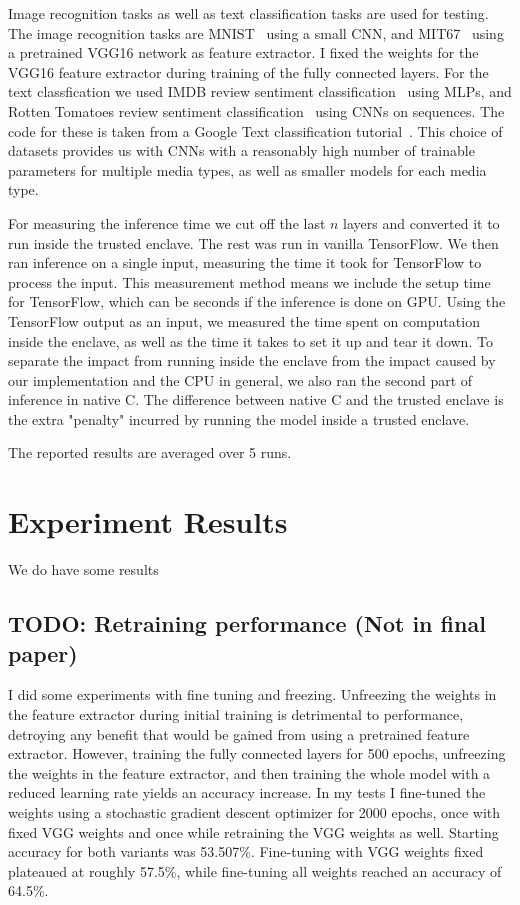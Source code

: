 \documentclass[11pt,twocolumn]{article}
\newcommand{\tf}{TensorFlow}
\begin{document}
Image recognition tasks as well as text classification tasks are used for testing.
The image recognition tasks are MNIST~\cite{noauthor_mnist_nodate} using a small CNN, and MIT67~\cite{quattoni_recognizing_nodate} using a pretrained VGG16 network as feature extractor.
I fixed the weights for the VGG16 feature extractor during training of the fully connected layers.
For the text classfication we used IMDB review sentiment classification~\cite{maas_learning_2011} using MLPs, and Rotten Tomatoes review sentiment classification~\cite{noauthor_sentiment_nodate} using CNNs on sequences.
The code for these is taken from a Google Text classification tutorial~\cite{noauthor_googleeng-edu_nodate}.
This choice of datasets provides us with CNNs with a reasonably high number of trainable parameters for multiple media types, as well as smaller models for each media type.

For measuring the inference time we cut off the last $n$ layers and converted it to run inside the trusted enclave.
The rest was run in vanilla \tf{}.
We then ran inference on a single input, measuring the time it took for \tf{} to process the input.
This measurement method means we include the setup time for \tf{}, which can be seconds if the inference is done on GPU.
Using the \tf{} output as an input, we measured the time spent on computation inside the enclave, as well as the time it takes to set it up and tear it down.
To separate the impact from running inside the enclave from the impact caused by our implementation and the CPU in general, we also ran the second part of inference in native C.
The difference between native C and the trusted enclave is the extra "penalty" incurred by running the model inside a trusted enclave.

The reported results are averaged over 5 runs.

\section{Experiment Results}
\label{sec:results}

We do have some results

\subsection{TODO: Retraining performance (Not in final paper)}

I did some experiments with fine tuning and freezing.
Unfreezing the weights in the feature extractor during initial training is detrimental to performance, detroying any benefit that would be gained from using a pretrained feature extractor.
However, training the fully connected layers for 500 epochs, unfreezing the weights in the feature extractor, and then training the whole model with a reduced learning rate yields an accuracy increase.
In my tests I fine-tuned the weights using a stochastic gradient descent optimizer for 2000 epochs, once with fixed VGG weights and once while retraining the VGG weights as well.
Starting accuracy for both variants was 53.507\%.
Fine-tuning with VGG weights fixed plateaued at roughly 57.5\%, while fine-tuning all weights reached an accuracy of 64.5\%.
\end{document}
